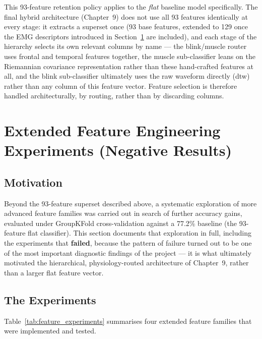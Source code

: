 This 93-feature retention policy applies to the \emph{flat}
baseline model specifically. The final hybrid architecture
(Chapter~9) does not use all 93 features identically at every
stage: it extracts a superset once (93 base features, extended
to 129 once the EMG descriptors introduced in
Section~\ref{sec:fe_negative} are included), and each stage of
the hierarchy selects its own relevant columns by name --- the
blink/muscle router uses frontal and temporal features
together, the muscle sub-classifier leans on the Riemannian
covariance representation rather than these hand-crafted
features at all, and the blink sub-classifier ultimately uses
the raw waveform directly (\acrshort{dtw}) rather than any
column of this feature vector. Feature selection is therefore
handled architecturally, by routing, rather than by discarding
columns.

\section{Extended Feature Engineering Experiments (Negative Results)}
\label{sec:fe_negative}

\subsection{Motivation}

Beyond the 93-feature superset described above, a systematic
exploration of more advanced feature families was carried out
in search of further accuracy gains, evaluated under
GroupKFold cross-validation against a 77.2\% baseline (the
93-feature flat classifier). This section documents that
exploration in full, including the experiments that
\textbf{failed}, because the pattern of failure turned out to
be one of the most important diagnostic findings of the
project --- it is what ultimately motivated the hierarchical,
physiology-routed architecture of Chapter~9, rather than a
larger flat feature vector.

\subsection{The Experiments}

Table~\ref{tab:feature_experiments} summarises four extended
feature families that were implemented and tested.

